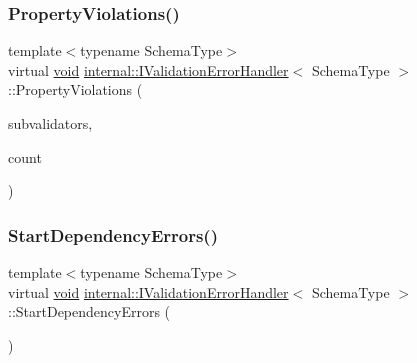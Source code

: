 \mbox{\label{classinternal_1_1IValidationErrorHandler_abd92773fa046eeb6fd8416468e62e5b1}} 
\subsubsection{\texorpdfstring{Property\+Violations()}{PropertyViolations()}}
{\footnotesize\ttfamily template$<$typename Schema\+Type$>$ \\
virtual \hyperlink{imgui__impl__opengl3__loader_8h_ac668e7cffd9e2e9cfee428b9b2f34fa7}{void} \hyperlink{classinternal_1_1IValidationErrorHandler}{internal\+::\+I\+Validation\+Error\+Handler}$<$ Schema\+Type $>$\+::Property\+Violations (\begin{DoxyParamCaption}\item[{\hyperlink{classinternal_1_1ISchemaValidator}{I\+Schema\+Validator} $\ast$$\ast$}]{subvalidators,  }\item[{\hyperlink{rapidjson_8h_a5ed6e6e67250fadbd041127e6386dcb5}{Size\+Type}}]{count }\end{DoxyParamCaption})\hspace{0.3cm}{\ttfamily [pure virtual]}}

\mbox{\label{classinternal_1_1IValidationErrorHandler_ab3cf4b9fe450ff76f52d70a2888f0342}} 
\subsubsection{\texorpdfstring{Start\+Dependency\+Errors()}{StartDependencyErrors()}}
{\footnotesize\ttfamily template$<$typename Schema\+Type$>$ \\
virtual \hyperlink{imgui__impl__opengl3__loader_8h_ac668e7cffd9e2e9cfee428b9b2f34fa7}{void} \hyperlink{classinternal_1_1IValidationErrorHandler}{internal\+::\+I\+Validation\+Error\+Handler}$<$ Schema\+Type $>$\+::Start\+Dependency\+Errors (\begin{DoxyParamCaption}{ }\end{DoxyParamCaption})\hspace{0.3cm}{\ttfamily [pure virtual]}}



